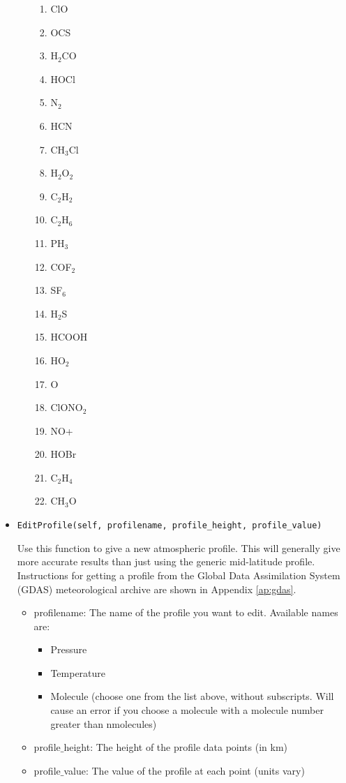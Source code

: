 \documentclass{article}
\begin{document}
\begin{itemize}
\begin{itemize}
\begin{enumerate}
                \item   ClO
                \item   OCS
                \item   H$_2$CO		 
                \item   HOCl
                \item   N$_2$
                \item   HCN
                \item   CH$_3$Cl
                \item   H$_2$O$_2$
                \item   C$_2$H$_2$
                \item   C$_2$H$_6$
                \item   PH$_3$
                \item   COF$_2$
                \item   SF$_6$
                \item   H$_2$S
                \item   HCOOH
                \item   HO$_2$
                \item   O
                \item   ClONO$_2$
                \item   NO+
                \item   HOBr
                \item   C$_2$H$_4$
                \item   CH$_3$O
  \end{enumerate}
  \end{itemize}
  
  \item \begin{Verbatim}[commandchars=\\\{\}]
EditProfile(self, profilename, profile_height, profile_value)
    \end{Verbatim}
   Use this function to give a new atmospheric profile. This will generally give more accurate results than just using the generic mid-latitude profile. Instructions for getting a profile from the Global Data Assimilation System (GDAS) meteorological archive are shown in Appendix \ref{ap:gdas}.
  
  \begin{itemize}
  \item profilename: The name of the profile you want to edit. Available names are:
  \begin{itemize}
    \item Pressure
    \item Temperature
    \item Molecule (choose one from the list above, without subscripts. Will cause an error if you choose a molecule with a molecule number greater than nmolecules)
  \end{itemize}
  \item profile$\_$height: The height of the profile data points (in km)
  \item profile$\_$value: The value of the profile at each point (units vary)
  \end{itemize}
  

\end{itemize}
\end{document}
